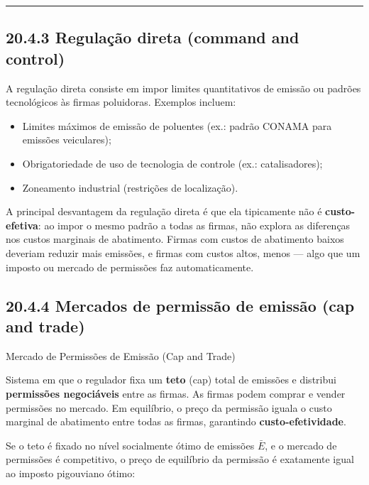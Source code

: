 \documentclass[11pt,twoside,openright]{book}
\providecommand{\tightlist}{\setlength{\itemsep}{0pt}\setlength{\parskip}{0pt}}
\begin{document}
\begin{center}\rule{0.5\linewidth}{0.5pt}\end{center}

\subsection{20.4.3 Regulação direta (command and
control)}\label{regulauxe7uxe3o-direta-command-and-control}

A regulação direta consiste em impor limites quantitativos de emissão ou
padrões tecnológicos às firmas poluidoras. Exemplos incluem:

\begin{itemize}
\tightlist
\item
  Limites máximos de emissão de poluentes (ex.: padrão CONAMA para
  emissões veiculares);
\item
  Obrigatoriedade de uso de tecnologia de controle (ex.: catalisadores);
\item
  Zoneamento industrial (restrições de localização).
\end{itemize}

A principal desvantagem da regulação direta é que ela tipicamente não é
\textbf{custo-efetiva}: ao impor o mesmo padrão a todas as firmas, não
explora as diferenças nos custos marginais de abatimento. Firmas com
custos de abatimento baixos deveriam reduzir mais emissões, e firmas com
custos altos, menos --- algo que um imposto ou mercado de permissões faz
automaticamente.

\subsection{20.4.4 Mercados de permissão de emissão (cap and
trade)}\label{mercados-de-permissuxe3o-de-emissuxe3o-cap-and-trade}

\begin{definitionbox}{Mercado de Permissões de Emissão (Cap and Trade)}

Sistema em que o regulador fixa um \textbf{teto} (cap) total de emissões
e distribui \textbf{permissões negociáveis} entre as firmas. As firmas
podem comprar e vender permissões no mercado. Em equilíbrio, o preço da
permissão iguala o custo marginal de abatimento entre todas as firmas,
garantindo \textbf{custo-efetividade}.

\end{definitionbox}

Se o teto é fixado no nível socialmente ótimo de emissões \(\bar{E}\), e
o mercado de permissões é competitivo, o preço de equilíbrio da
permissão é exatamente igual ao imposto pigouviano ótimo:
\end{document}

